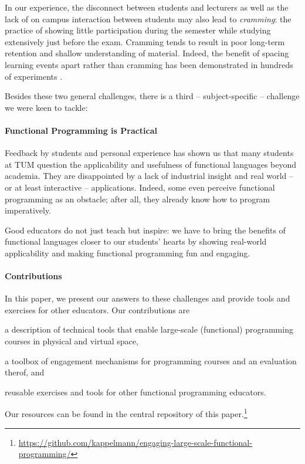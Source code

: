 In our experience, the disconnect between students and lecturers as well as the lack of on campus interaction between students may also lead to \emph{cramming}:
the practice of showing little participation during the semester
while studying extensively just before the exam.
Cramming tends to result in poor long-term retention and shallow understanding of material.
Indeed, the benefit of spacing learning events apart rather than cramming has been demonstrated in hundreds of experiments \cite{cramming1,cramming2}.

\vspace{\baselineskip}\noindent
Besides these two general challenges,
there is a third -- subject-specific --
challenge we were keen to tackle:

\paragraph{Functional Programming is Practical}
Feedback by students and personal experience has shown us that many students
at TUM question the applicability and usefulness
of functional languages beyond academia.
They are disappointed by a lack of industrial insight
and real world -- or at least interactive -- applications.
Indeed, some even perceive functional programming as an obstacle;
after all, they already know how to program imperatively.

Good educators do not just teach but inspire:
we have to bring the benefits of functional languages
closer to our students' hearts
by showing real-world applicability and making functional programming fun and engaging.

\paragraph{Contributions}

In this paper,
we present our answers to these challenges
and provide tools and exercises for other educators.
Our contributions are
\begin{enumerate*}[label=\arabic*)]
  \item a description of technical tools that enable large-scale (functional) programming courses in physical and virtual space,
  \item a toolbox of engagement mechanisms
for programming courses
and an evaluation therof, and
  \item reusable exercises and tools for other functional programming educators.
\end{enumerate*}
Our resources can be found in the central repository of this paper.\footnote{\url{https://github.com/kappelmann/engaging-large-scale-functional-programming/}}

